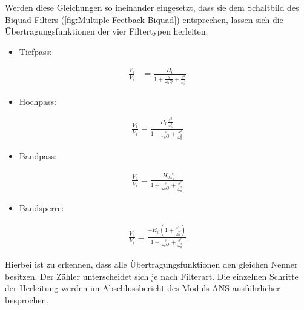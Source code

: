 \documentclass[../main_config.tex]{subfiles}
\begin{document}
Werden diese Gleichungen so ineinander eingesetzt, dass sie dem Schaltbild des Biquad-Filters (\ref{fig:Multiple-Feetback-Biquad}) entsprechen, lassen sich die Übertragungsfunktionen der vier Filtertypen herleiten:  \par

\begin{itemize}
    \item Tiefpass:
\end{itemize}
\begin{align}
    \frac{V_3}{V_i} &= \frac{H_0}{1 + \frac{s}{\omega_0 Q} + \frac{s^2}{\omega_0^2}}\label{eq:tf_lp}
\end{align}

\begin{itemize}
    \item Hochpass:
\end{itemize}
\begin{align}
    \frac{V_1}{V_i} = \frac{H_0  \frac{s^2}{\omega_0^2}}{1 + \frac{s}{\omega_0 Q} + \frac{s^2}{\omega_0^2}} \label{eq:tf_hp}
\end{align}


\begin{itemize}
    \item Bandpass:
\end{itemize}
\begin{align}
    \frac{V_2}{V_i} = \frac{-H_0  \frac{s}{\omega_0}}{ 1 + \frac{s}{\omega_0 Q} + \frac{s^2}{\omega_0^2} } \label{eq:tf_bp}
\end{align}   

\begin{itemize}
    \item Bandsperre:
\end{itemize}
\begin{align}
    \frac{V_4}{V_i}= \frac{-H_0 \left( 1 + \frac{s^2}{\omega_0^2} \right)}{1 + \frac{s}{\omega_0 Q} + \frac{s^2}{\omega_0^2} } \label{eq:tf_bs}
\end{align}

Hierbei ist zu erkennen, dass alle Übertragungsfunktionen den gleichen Nenner besitzen. Der Zähler unterscheidet sich je nach Filterart. Die einzelnen Schritte der Herleitung werden im Abschlussbericht des Moduls ANS \cite{LabANS} ausführlicher besprochen.

\end{document}
